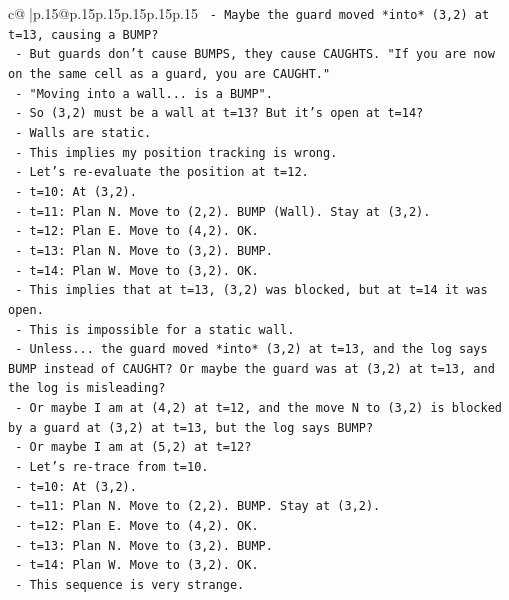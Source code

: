 \documentclass{article}
\begin{document}
{\begin{supertabular}{c@{$\;$}|p{.15\linewidth}@{}p{.15\linewidth}p{.15\linewidth}p{.15\linewidth}p{.15\linewidth}p{.15\linewidth}}
{{{\texttt{    {-} Maybe the guard moved *into* (3,2) at t=13, causing a BUMP?} \\
\texttt{    {-} But guards don't cause BUMPS, they cause CAUGHTS. "If you are now on the same cell as a guard, you are CAUGHT."} \\
\texttt{    {-} "Moving into a wall... is a BUMP".} \\
\texttt{    {-} So (3,2) must be a wall at t=13? But it's open at t=14?} \\
\texttt{    {-} Walls are static.} \\
\texttt{    {-} This implies my position tracking is wrong.} \\
\texttt{    {-} Let's re{-}evaluate the position at t=12.} \\
\texttt{    {-} t=10: At (3,2).} \\
\texttt{    {-} t=11: Plan N. Move to (2,2). BUMP (Wall). Stay at (3,2).} \\
\texttt{    {-} t=12: Plan E. Move to (4,2). OK.} \\
\texttt{    {-} t=13: Plan N. Move to (3,2). BUMP.} \\
\texttt{    {-} t=14: Plan W. Move to (3,2). OK.} \\
\texttt{    {-} This implies that at t=13, (3,2) was blocked, but at t=14 it was open.} \\
\texttt{    {-} This is impossible for a static wall.} \\
\texttt{    {-} Unless... the guard moved *into* (3,2) at t=13, and the log says BUMP instead of CAUGHT? Or maybe the guard was at (3,2) at t=13, and the log is misleading?} \\
\texttt{    {-} Or maybe I am at (4,2) at t=12, and the move N to (3,2) is blocked by a guard at (3,2) at t=13, but the log says BUMP?} \\
\texttt{    {-} Or maybe I am at (5,2) at t=12?} \\
\texttt{    {-} Let's re{-}trace from t=10.} \\
\texttt{    {-} t=10: At (3,2).} \\
\texttt{    {-} t=11: Plan N. Move to (2,2). BUMP. Stay at (3,2).} \\
\texttt{    {-} t=12: Plan E. Move to (4,2). OK.} \\
\texttt{    {-} t=13: Plan N. Move to (3,2). BUMP.} \\
\texttt{    {-} t=14: Plan W. Move to (3,2). OK.} \\
\texttt{    {-} This sequence is very strange.} \\
}}}
\end{supertabular}}
\end{document}
